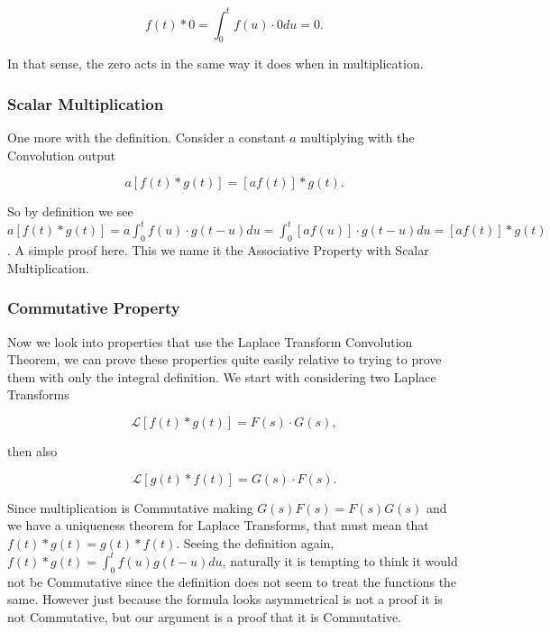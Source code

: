 \documentclass[12pt]{article}
\newcommand{\lp}{\mathscr{L}}
\begin{document}
\begin{equation*}
    f(t) \ast 0 = \int_{0}^{t} f(u)\cdot 0 du=0.
\end{equation*}

In that sense, the zero acts in the same way it does when in multiplication.

\subsubsection{Scalar Multiplication}

One more with the definition. Consider a constant $a$ multiplying with the Convolution output

\begin{equation*}
    a[f(t) \ast g(t)] = [af(t)] \ast g(t).
\end{equation*}

So by definition we see $a[f(t) \ast g(t)]=a\int_{0}^{t} f(u)\cdot g(t-u) du =\int_{0}^{t} [af(u)]\cdot g(t-u) du = [af(t)] \ast g(t)$. A simple proof here. This we name it the Associative Property with Scalar Multiplication.

\subsubsection{Commutative Property}

Now we look into properties that use the Laplace Transform Convolution Theorem, we can prove these properties quite easily relative to trying to prove them with only the integral definition. We start with considering two Laplace Transforms

\begin{equation*}
    \lp[f(t)\ast g(t)]=F(s)\cdot G(s),
\end{equation*}

then also

\begin{equation*}
    \lp[g(t)\ast f(t)]=G(s)\cdot F(s).
\end{equation*}

Since multiplication is Commutative making $G(s)F(s)=F(s)G(s)$ and we have a uniqueness theorem for Laplace Transforms, that must mean that $f(t) \ast g(t)=g(t) \ast f(t)$. Seeing the definition again, $f(t) \ast g(t) = \int_{0}^{t} f(u)g(t-u) du$, naturally it is tempting to think it would not be Commutative since the definition does not seem to treat the functions the same. However just because the formula looks asymmetrical is not a proof it is not Commutative, but our argument is a proof that it is Commutative. \\
\end{document}
